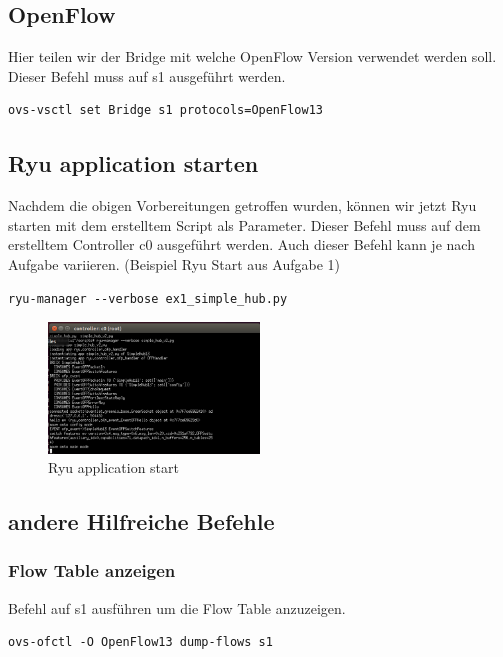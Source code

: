 \documentclass[a4,12pt]{scrartcl}
\begin{document}
\subsection{OpenFlow}
Hier teilen wir der Bridge mit welche OpenFlow Version verwendet werden soll. Dieser Befehl muss auf s1 ausgeführt werden. 
\begin{lstlisting}
ovs-vsctl set Bridge s1 protocols=OpenFlow13
\end{lstlisting}

\subsection{Ryu application starten}
Nachdem die obigen Vorbereitungen getroffen wurden, können wir jetzt Ryu starten mit dem erstelltem Script als Parameter. Dieser Befehl muss auf dem erstelltem Controller c0 ausgeführt werden. Auch dieser Befehl kann je nach Aufgabe variieren. (Beispiel Ryu Start aus Aufgabe 1) 
\begin{lstlisting}
ryu-manager --verbose ex1_simple_hub.py
\end{lstlisting}
\begin{figure} [H]
	\begin{center}
	\includegraphics[width=0.50\textwidth]{./pictures/ryu_start_simple_hub.png}
	\caption{Ryu application start}
	\label{x}
	\end{center}
\end{figure} 

\subsection{andere Hilfreiche Befehle}
\subsubsection{Flow Table anzeigen}
Befehl auf s1 ausführen um die Flow Table anzuzeigen. 
\begin{lstlisting}
ovs-ofctl -O OpenFlow13 dump-flows s1
\end{lstlisting}
\newpage
\end{document}
